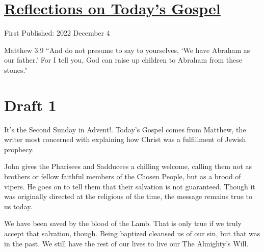 \documentclass[12pt]{article}[titlepage]
\newcommand{\say}[1]{``#1''}
\newcommand{\nsay}[1]{`#1'}
\newcommand{\1}{\={a}}
\newcommand{\2}{\={e}}
\newcommand{\3}{\={\i}}
\newcommand{\4}{\=o}
\newcommand{\5}{\=u}
\newcommand{\6}{\={A}}
\renewcommand{\,}{\textsuperscript{,}}
\begin{document}
\doublespacing
\section{\href{reflections-on-readings-2-advent-a-22.html}{Reflections on Today's Gospel}}
First Published: 2022 December 4

Matthew 3:9 \say{And do not presume to say to yourselves, \nsay{We have Abraham as our father.} For I tell you, God can raise up children to Abraham from these stones.}

\section{Draft 1}
It's the Second Sunday in Advent!.
Today's Gospel comes from Matthew, the writer most concerned with explaining how Christ was a fulfillment of Jewish prophecy.

John gives the Pharisees and Sadducees a chilling welcome, calling them not as brothers or fellow faithful members of the Chosen People, but as a brood of vipers.
He goes on to tell them that their salvation is not guaranteed.
Though it was originally directed at the religious of the time, the message remains true to us today.

We have been saved by the blood of the Lamb.
That is only true if we truly accept that salvation, though.
Being baptized cleansed us of our sin, but that was in the past.
We still have the rest of our lives to live our The Almighty's Will.
\end{document}
